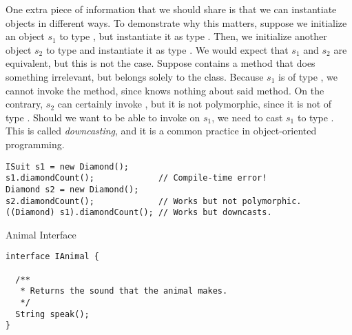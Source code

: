 One extra piece of information that we should share is that we can instantiate objects in different ways. To demonstrate why this matters, suppose we initialize an object $s_1$ to type , but instantiate it as type . Then, we initialize another object $s_2$ to type  and instantiate it as type . We would expect that $s_1$ and $s_2$ are equivalent, but this is not the case. Suppose  contains a method  that does something irrelevant, but belongs solely to the  class. Because $s_1$ is of type , we cannot invoke the  method, since  knows nothing about said method. On the contrary, $s_2$ can certainly invoke , but it is not polymorphic, since it is not of type . Should we want to be able to invoke  on $s_1$, we need to cast $s_1$ to type . This is called \textit{downcasting}, and it is a common practice in object-oriented programming.

\par{
\begin{verbatim}
ISuit s1 = new Diamond();
s1.diamondCount();             // Compile-time error!
Diamond s2 = new Diamond();
s2.diamondCount();             // Works but not polymorphic.
((Diamond) s1).diamondCount(); // Works but downcasts.
\end{verbatim}
}


\begin{cl}{Animal Interface}
\begin{lstlisting}[language=MyJava]
interface IAnimal {

  /**
   * Returns the sound that the animal makes.
   */
  String speak();
}
\end{lstlisting}
\end{cl}

